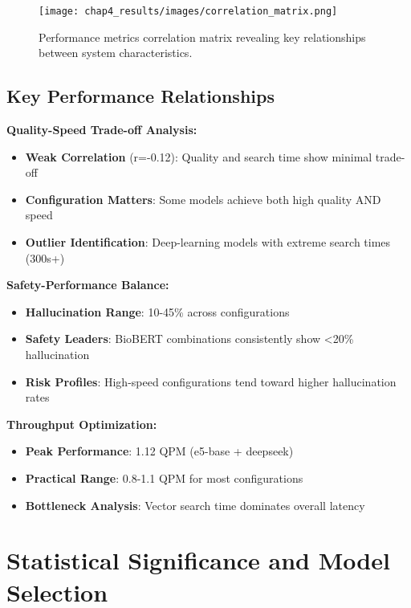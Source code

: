 \begin{figure}[!htbp]
    \centering
    \texttt{[image: chap4\_results/images/correlation\_matrix.png]}
    \caption{Performance metrics correlation matrix revealing key relationships between system characteristics.}
    \label{fig:correlation_matrix}
\end{figure}

\subsection{Key Performance Relationships}

\textbf{Quality-Speed Trade-off Analysis:}
\begin{itemize}
    \item \textbf{Weak Correlation} (r=-0.12): Quality and search time show minimal trade-off
    \item \textbf{Configuration Matters}: Some models achieve both high quality AND speed
    \item \textbf{Outlier Identification}: Deep-learning models with extreme search times (300s+)
\end{itemize}

\textbf{Safety-Performance Balance:}
\begin{itemize}
    \item \textbf{Hallucination Range}: 10-45\% across configurations
    \item \textbf{Safety Leaders}: BioBERT combinations consistently show \textless20\% hallucination
    \item \textbf{Risk Profiles}: High-speed configurations tend toward higher hallucination rates
\end{itemize}

\textbf{Throughput Optimization:}
\begin{itemize}
    \item \textbf{Peak Performance}: 1.12 QPM (e5-base + deepseek)
    \item \textbf{Practical Range}: 0.8-1.1 QPM for most configurations
    \item \textbf{Bottleneck Analysis}: Vector search time dominates overall latency
\end{itemize}

\section{Statistical Significance and Model Selection}

